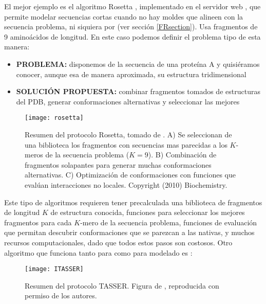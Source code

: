 El mejor ejemplo es el algoritmo Rosetta \citep{Simons1997}, implementado en el servidor web 
, 
que permite modelar secuencias cortas cuando no hay moldes que alineen con la secuencia problema, 
ni siquiera por  (ver secci\'{o}n \ref{FRsection}). 
Usa fragmentos de 9 amino\'{a}cidos de longitud. En este caso podemos definir el problema tipo de esta manera:

\begin{itemize}
\item \textbf{PROBLEMA:} disponemos de la secuencia de una prote\'{i}na A y quisi\'{e}ramos conocer, aunque esa de manera aproximada, su estructura tridimensional
\item \textbf{SOLUCI\'{O}N PROPUESTA:} combinar fragmentos tomados de estructuras del PDB, generar conformaciones alternativas y seleccionar las mejores
\end{itemize}

\begin{figure}
\begin{center} 
\texttt{[image: rosetta]}
\caption%
{
Resumen del protocolo Rosetta, tomado de \citet{Kaufmann2010}.
A) Se seleccionan de una biblioteca los fragmentos con secuencias mas parecidas a los $K$-meros de la secuencia problema ($K=9$).
B) Combinaci\'{o}n de fragmentos solapantes para generar muchas conformaciones alternativas.
C) Optimizaci\'{o}n de conformaciones con funciones que eval\'{u}an interacciones no locales. 
Copyright (2010) Biochemistry.
}
\label{fig:Rosetta}
\end{center}
\end{figure}

Este tipo de algoritmos requieren tener precalculada una biblioteca de fragmentos de longitud $K$ de estructura conocida,
funciones para seleccionar los mejores fragmentos para cada $K$-mero de la secuencia problema,
funciones de evaluaci\'{o}n que permitan descubrir conformaciones que se parezcan a las nativas, 
y muchos recursos computacionales, dado que todos estos pasos son costosos.
Otro algoritmo que funciona tanto para  como para modelado  es 
:

\begin{figure}
\begin{center} 
\texttt{[image: ITASSER]}
\caption%
{
Resumen del protocolo TASSER. 
Figura de \citet{Wu2007}, reproducida con permiso de los autores.
}
\label{fig:ITASSER}
\end{center}
\end{figure}
